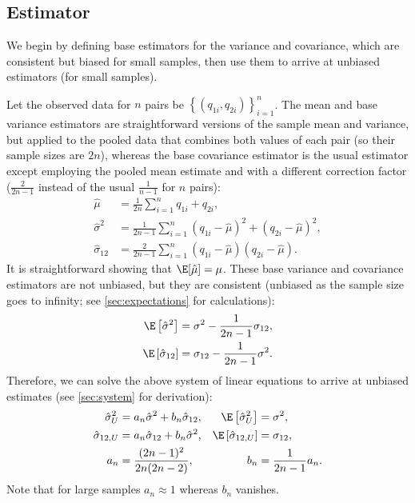 \documentclass[11pt]{article}
\begin{document}
\subsection{Estimator}

We begin by defining base estimators for the variance and covariance, which are consistent but biased for small samples, then use them to arrive at unbiased estimators (for small samples).

Let the observed data for $n$ pairs be $\left\{ (q_{1i}, q_{2i}) \right\}_{i=1}^n$.
The mean and base variance estimators are straightforward versions of the sample mean and variance, but applied to the pooled data that combines both values of each pair (so their sample sizes are $2n$), whereas the base covariance estimator is the usual estimator except employing the pooled mean estimate and with a different correction factor ($\frac{2}{2n - 1}$ instead of the usual $\frac{1}{n - 1}$ for $n$ pairs):
\begin{align*}
  \hat{\mu}
  &=
    \frac{1}{2n} \sum_{i=1}^n q_{1i} + q_{2i}
    , \\
  \hat{\sigma}^2
  &=
    \frac{1}{2n - 1} \sum_{i=1}^n ( q_{1i} - \hat{\mu} )^2 + ( q_{2i} - \hat{\mu} )^2
    , \\
  \hat{\sigma}_{12}
  &=
    \frac{2}{2n - 1} \sum_{i=1}^n ( q_{1i} - \hat{\mu} )( q_{2i} - \hat{\mu} )
    .
\end{align*}
It is straightforward showing that $\E[ \hat{\mu} ] = \mu$.
These base variance and covariance estimators are not unbiased, but they are consistent (unbiased as the sample size goes to infinity; see \cref{sec:expectations} for calculations):
\begin{align*}
  \E \left[ \hat{\sigma}^2 \right]
  &=
    \sigma^2 - \frac{1}{2n - 1} \sigma_{12}
    , \\
  \E \left[ \hat{\sigma}_{12} \right]
  &=
    \sigma_{12} - \frac{1}{2n-1} \sigma^2
.
\end{align*}
Therefore, we can solve the above system of linear equations to arrive at unbiased estimates (see \cref{sec:system} for derivation):
\begin{align*}
  \hat{\sigma}^2_U
  &=
    a_n \hat{\sigma}^2 + b_n \hat{\sigma}_{12}
    ,
  &\E \left[ \hat{\sigma}^2_U \right]
  &= \sigma^2
    , \\
  \hat{\sigma}_{12,U}
  &=
    a_n \hat{\sigma}_{12} + b_n \hat{\sigma}^2
    ,
  &\E \left[ \hat{\sigma}_{12,U} \right]
  &= \sigma_{12}
    , \\
  a_n
  &=
    \frac{(2n-1)^2}{2n(2n-2)}
    ,
  &b_n
  &=
    \frac{1}{2n-1} a_n
    .
\end{align*}
Note that for large samples $a_n \approx 1$ whereas $b_n$ vanishes.
\end{document}
